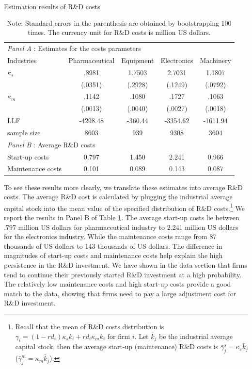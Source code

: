 \documentclass[11pt]{article}
\begin{document}
\begin{table}[h]
    \centering
    \caption{Estimation results of R\&D costs}
    \label{T13}
    \begin{tabular}{lcccc}
    \toprule
    \multicolumn{5}{l}{{\it Panel A }: Estimates for the costs parameters} \\
    Industries & Pharmaceutical & Equipment & Electronics & Machinery \\
    \hline
    $\kappa_{s}$      & .8981   & 1.7503  & 2.7031   & 1.1807   \\
                & (.0351)   & (.2928)  & (.1249)  & (.0792)  \\
    $\kappa_{m}$     & .1142   & .1080  & .1727   & .1063   \\
                & (.0013)   & (.0040)  & (.0027)   & (.0018)   \\
    \hline
    LLF         & -4298.48 & -360.44 & -3354.62 & -1611.94 \\
    sample size & 8603     & 939     & 9308     & 3604   \\ 
    \hline
    \multicolumn{5}{l}{{\it Panel B }: Average R\&D costs} \\
    Start-up costs                         &0.797 & 1.450 & 2.241 & 0.966 \\
    Maintenance costs                       &0.101 & 0.089 & 0.143 & 0.087\\ \bottomrule
    \end{tabular}
    \caption*{\small{}Note: Standard errors in the parenthesis are obtained by bootstrapping 100 times. The currency unit for R\&D costs is million US dollars.}{\small \par}
\end{table}
To see these results more clearly, we translate these estimates into average R\&D costs. The average R\&D cost is calculated by plugging the industrial average capital stock into the mean value of the specified distribution of R\&D costs.\footnote{Recall that the mean of R\&D costs distribution is $\gamma_{i}= (1-rd_{i})\kappa_sk_{i}+rd_{i}\kappa_mk_{i}$ for firm $i$. Let $\bar{k}_j$ be the industrial average capital stock, then the average start-up (maintenance) R\&D costs is $\bar{\gamma}_j^s = \kappa_s\bar{k}_j$ ($\bar{\gamma}_j^m = \kappa_m\bar{k}_j$).}  We report the results in Panel B of Table \ref{T13}. The average start-up costs lie between .797 million US dollars for pharmaceutical industry to 2.241 million US dollars for the electronics industry. While the maintenance costs range from 87 thousands of US dollars to 143 thousands of US dollars. The difference in magnitudes of start-up costs and maintenance costs help explain the high persistence in the R\&D investment. We have shown in the data section that firms tend to continue their previously started R\&D investment at a high probability. The relatively low maintenance costs and high start-up costs provide a good match to the data, showing that firms need to pay a large adjustment cost for R\&D investment. 
\end{document}
